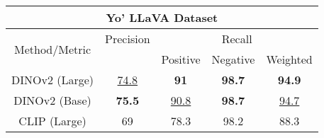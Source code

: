 \small
\begin{tabular}{|c|c|c|c|c|}
\hline
\multicolumn{5}{|c|}{\textbf{Yo' LLaVA Dataset}} \\
\hline
\multirow{2}{*}{Method/Metric} & \multicolumn{1}{c|}{Precision} & \multicolumn{3}{c|}{Recall} \\
 & & Positive & Negative & Weighted \\
\hline
DINOv2 (Large) & \underline{74.8} & \textbf{91} & \textbf{98.7} & \textbf{94.9}\\
\hline
DINOv2 (Base) & \textbf{75.5} & \underline{90.8} & \textbf{98.7} & \underline{94.7}\\
\hline
CLIP (Large) & 69  & 78.3 & 98.2 & 88.3\\
\hline
\end{tabular}